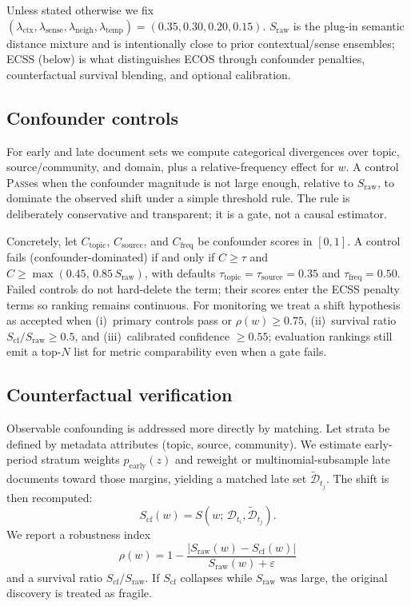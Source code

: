 \documentclass{llncs}
\newcommand{\addrev}[1]{{\color{blue}#1}}
\begin{document}
\addrev{Unless stated otherwise we fix
$(\lambda_{\mathrm{ctx}},\lambda_{\mathrm{sense}},\lambda_{\mathrm{neigh}},\lambda_{\mathrm{temp}})=(0.35,0.30,0.20,0.15)$.
$S_{\mathrm{raw}}$ is the plug-in semantic distance mixture and is intentionally close to prior contextual/sense ensembles; ECSS (below) is what distinguishes ECOS through confounder penalties, counterfactual survival blending, and optional calibration.}

\subsection{Confounder controls}
For early and late document sets we compute categorical divergences over topic, source/community, and domain, plus a relative-frequency effect for $w$.
A control \textsc{Pass}es when the confounder magnitude is not large enough, relative to $S_{\mathrm{raw}}$, to dominate the observed shift under a simple threshold rule.
The rule is deliberately conservative and transparent; it is a gate, not a causal estimator.


\addrev{Concretely, let $C_{\mathrm{topic}}$, $C_{\mathrm{source}}$, and $C_{\mathrm{freq}}$ be confounder scores in $[0,1]$.
A control fails (confounder-dominated) if and only if $C\ge\tau$ and $C\ge\max(0.45,\,0.85\,S_{\mathrm{raw}})$, with defaults $\tau_{\mathrm{topic}}=\tau_{\mathrm{source}}=0.35$ and $\tau_{\mathrm{freq}}=0.50$.
Failed controls do not hard-delete the term; their scores enter the ECSS penalty terms so ranking remains continuous.
For monitoring we treat a shift hypothesis as accepted when (i)~primary controls pass or $\rho(w)\ge 0.75$, (ii)~survival ratio $S_{\mathrm{cf}}/S_{\mathrm{raw}} \ge 0.5$, and (iii)~calibrated confidence $\ge 0.55$; evaluation rankings still emit a top-$N$ list for metric comparability even when a gate fails.}

\subsection{Counterfactual verification}
Observable confounding is addressed more directly by matching.
Let strata be defined by metadata attributes (topic, source, community).
We estimate early-period stratum weights $p_{\mathrm{early}}(z)$ and reweight or multinomial-subsample late documents toward those margins, yielding a matched late set $\tilde{\mathcal{D}}_{t_j}$.
The shift is then recomputed:
\begin{equation}
S_{\mathrm{cf}}(w)=S\!\left(w;\,\mathcal{D}_{t_i},\tilde{\mathcal{D}}_{t_j}\right).
\end{equation}
We report a robustness index
\begin{equation}
\rho(w)=1-\frac{\lvert S_{\mathrm{raw}}(w)-S_{\mathrm{cf}}(w)\rvert}{S_{\mathrm{raw}}(w)+\varepsilon}
\end{equation}
and a survival ratio $S_{\mathrm{cf}}/S_{\mathrm{raw}}$.
If $S_{\mathrm{cf}}$ collapses while $S_{\mathrm{raw}}$ was large, the original discovery is treated as fragile.
\end{document}
